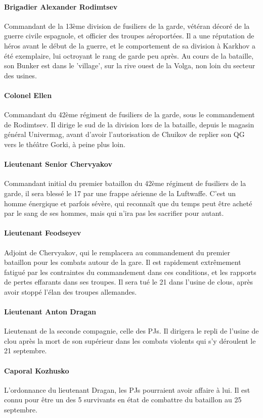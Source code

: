 \documentclass{report}
\begin{document}
\begin{multicols}{2}
\paragraph{Brigadier Alexander Rodimtsev} Commandant de la 13ème division de fusiliers de la garde, vétéran décoré de la guerre civile espagnole, et officier des troupes aéroportées. Il a une réputation de héros avant le début de la guerre, et le comportement de sa division à Karkhov a été exemplaire, lui octroyant le rang de garde peu après. Au cours de la bataille, son Bunker est dans le 'village', sur la rive ouest de la Volga, non loin du secteur des usines.
\paragraph{Colonel Ellen} Commandant du 42ème régiment de fusiliers de la garde, sous le commandement de Rodimtsev. Il dirige le sud de la division lors de la bataille, depuis le magasin général Univermag, avant d'avoir l'autorisation de Chuikov de replier son QG vers le théâtre Gorki, à peine plus loin.
\paragraph{Lieutenant Senior Chervyakov} Commandant initial du premier bataillon du 42ème régiment de fusiliers de la garde, il sera blessé le 17 par une frappe aérienne de la Luftwaffe. C'est un homme énergique et parfois sévère, qui reconnaît que du temps peut être acheté par le sang de ses hommes, mais qui n'ira pas les sacrifier pour autant. 
\paragraph{Lieutenant Feodseyev} Adjoint de Chervyakov, qui le remplacera au commandement du premier bataillon pour les combats autour de la gare. Il est rapidement extrêmement fatigué par les contraintes du commandement dans ces conditions, et les rapports de pertes effarants dans ses troupes. Il sera tué le 21 dans l'usine de clous, après avoir stoppé l'élan des troupes allemandes.
\paragraph{Lieutenant Anton Dragan} Lieutenant de la seconde compagnie, celle des PJs. Il dirigera le repli de l'usine de clou après la mort de son supérieur dans les combats violents qui s'y déroulent le 21 septembre.
\paragraph{Caporal Kozhusko} L'ordonnance du lieutenant Dragan, les PJs pourraient avoir affaire à lui. Il est connu pour être un des 5 survivants en état de combattre du bataillon au 25 septembre.

\end{multicols}
\end{document}
